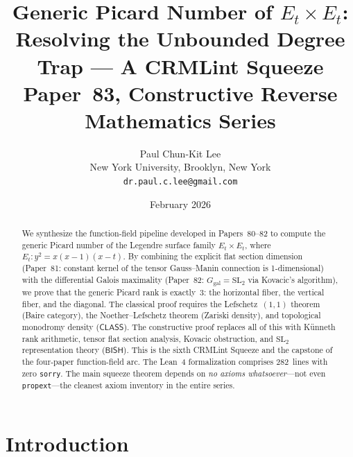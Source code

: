 \documentclass[11pt]{article}
\theoremstyle{plain}
\theoremstyle{definition}
\theoremstyle{remark}
\newcommand{\SL}{\mathrm{SL}}
\newcommand{\Ggal}{G_{\mathrm{gal}}}
\newcommand{\BISH}{\mathsf{BISH}}
\newcommand{\CLASS}{\mathsf{CLASS}}
\begin{document}

\title{%
  Generic Picard Number of $E_t \times E_t$:\\
  Resolving the Unbounded Degree Trap --- A CRMLint Squeeze\\[6pt]
  {\normalsize Paper~83, Constructive Reverse Mathematics Series}
}
\author{Paul Chun-Kit Lee\\
  \small New York University, Brooklyn, New York\\
  \small\texttt{dr.paul.c.lee@gmail.com}}
\date{February 2026}
\maketitle

\begin{abstract}
We synthesize the function-field pipeline developed in Papers~80--82 to compute the generic Picard number of the Legendre surface family $E_t \times E_t$, where $E_t : y^2 = x(x-1)(x-t)$.
By combining the explicit flat section dimension (Paper~81: constant kernel of the tensor Gauss--Manin connection is 1-dimensional) with the differential Galois maximality (Paper~82: $\Ggal = \SL_2$ via Kovacic's algorithm), we prove that the generic Picard rank is exactly~3: the horizontal fiber, the vertical fiber, and the diagonal.
The classical proof requires the Lefschetz~$(1,1)$ theorem (Baire category), the Noether--Lefschetz theorem (Zariski density), and topological monodromy density ($\CLASS$).
The constructive proof replaces all of this with K\"unneth rank arithmetic, tensor flat section analysis, Kovacic obstruction, and $\SL_2$ representation theory ($\BISH$).
This is the sixth CRMLint Squeeze and the capstone of the four-paper function-field arc.
The Lean~4 formalization comprises 282~lines with zero \texttt{sorry}.
The main squeeze theorem depends on \emph{no axioms whatsoever}---not even \texttt{propext}---the cleanest axiom inventory in the entire series.
\end{abstract}

\section{Introduction}
\label{sec:intro}
\end{document}
